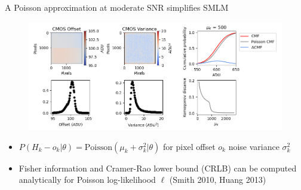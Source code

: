 \documentclass{beamer}					%
\begin{document}
\begin{frame}{A Poisson approximation at moderate SNR simplifies SMLM}

\begin{figure}
\includegraphics[width=13cm]{Noise.png}
\end{figure}

\begin{itemize}
\item $P(H_{k}-o_{k}|\theta) = \mathrm{Poisson}(\mu_{k}+\sigma_{k}^{2}|\theta)$ for pixel offset $o_{k}$ noise variance $\sigma_{k}^{2}$
\item Fisher information and Cramer-Rao lower bound (CRLB) can be computed analytically for Poisson log-likelihood $\ell$ (Smith 2010, Huang 2013)
\end{itemize} 
 
\end{frame}
\end{document}
